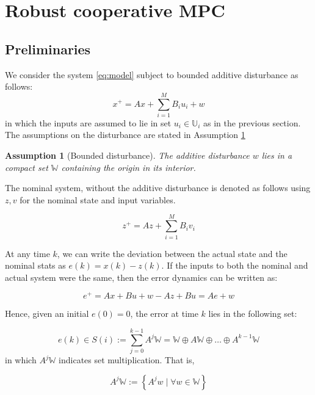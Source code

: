 \documentclass[10pt]{article}
\newcommand{\set}[1]{\left\lbrace #1 \right\rbrace}
\newtheorem{assumption}{Assumption}
\theoremstyle{definition}
\begin{document}
\section{Robust cooperative MPC}
\label{sec:tube}
\subsection{Preliminaries}
We consider the system \eqref{eq:model} subject to bounded additive
disturbance as follows:
\begin{equation}
\label{eq:model_dist}
x^+ = Ax + \sum_{i=1}^{M} B_i u_i + w
\end{equation}
in which the inputs are assumed to lie in set $u_i \in \mathbb{U}_i$
as in the previous section. The assumptions on the disturbance are
stated in Assumption \ref{ass:W}

\begin{assumption}[Bounded disturbance]
\label{ass:W}
The additive disturbance $w$ lies in a compact set $\mathbb{W}$
containing the origin in its interior.
\end{assumption}

The nominal system, without the additive disturbance is denoted as
follows using $z,v$ for the nominal state and input variables.

\begin{equation}
\label{eq:model_nominal}
z^+ = Az + \sum_{i=1}^{M} B_i v_i
\end{equation}

At any time $k$, we can write the deviation between the actual state
and the nominal stats as $e(k) = x(k)-z(k)$. If the inputs to both the
nominal and actual system were the same, then the error dynamics can
be written as:

\begin{equation}
\label{eq:error_dynamics}
e^+ = Ax+Bu+w - Az+Bu = Ae + w
\end{equation}

Hence, given an initial $e(0)=0$, the error at time $k$ lies in the
following set:

\begin{equation}
\label{eq:error_set}
e(k) \in S(i) :=\sum_{j=0}^{k-1}A^j\mathbb{W} = \mathbb{W} \oplus A\mathbb{W}
\oplus \ldots \oplus A^{k-1}\mathbb{W}
\end{equation}
in which $A^j\mathbb{W}$ indicates set multiplication. That is,

\[A^j\mathbb{W} := \set{A^jw \mid \forall w \in \mathbb{W}}
\]
\end{document}
